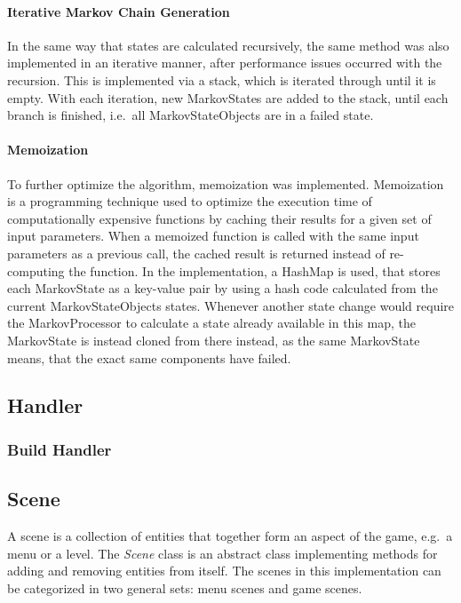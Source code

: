 \paragraph{Iterative Markov Chain Generation}
In the same way that states are calculated recursively, the same method was also implemented in an iterative manner,
after performance issues occurred with the recursion.
This is implemented via a stack, which is iterated through until it is empty.
With each iteration, new MarkovStates are added to the stack, until each branch is finished, i.e.\ all MarkovStateObjects are in a failed state.
\paragraph{Memoization}
To further optimize the algorithm, memoization was implemented.
Memoization is a programming technique used to optimize the execution time of computationally expensive functions by caching their results for a given set of input parameters.
When a memoized function is called with the same input parameters as a previous call, the cached result is returned instead of re-computing the function.
In the implementation, a HashMap is used, that stores each MarkovState as a key-value pair by using a hash code calculated from the current MarkovStateObjects states.
Whenever another state change would require the MarkovProcessor to calculate a state already available in this map, the MarkovState is instead cloned from there instead,
as the same MarkovState means, that the exact same components have failed.

\subsection{Handler}\label{subsec:handler}

\subsubsection{Build Handler}\label{subsubsec:build-handler}


\subsection{Scene}\label{subsec:scenes}
A scene is a collection of entities that together form an aspect of the game, e.g.\ a menu or a level.
The \textit{Scene} class is an abstract class implementing methods for adding and removing entities from itself.
The scenes in this implementation can be categorized in two general sets: menu scenes and game scenes.

